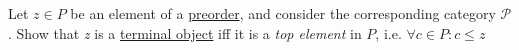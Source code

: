 Let $z \in P$ be an element of a \hyperref[D1.30]{preorder}, and consider the corresponding category $\mathcal{P}$. Show that \emph{z} is a \hyperref[D3.79]{terminal object} iff it is a \emph{top element} in $P$, i.e. $\forall c \in P: c \leq z$